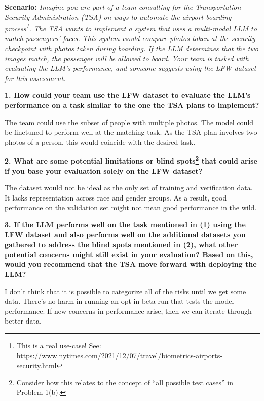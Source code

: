 \documentclass{article}
\begin{document}
\textbf{Scenario:} \textit{Imagine you are part of a team consulting for the Transportation Security Administration (TSA) on ways to automate the airport boarding process\footnote{ This is a real use-case! See:  \url{https://www.nytimes.com/2021/12/07/travel/biometrics-airports-security.html}}. The TSA wants to implement a system that uses a multi-modal LLM to match passengers' faces. This system would compare photos taken at the security checkpoint with photos taken during boarding. If the LLM determines that the two images match, the passenger will be allowed to board. Your team is tasked with evaluating the LLM's performance, and someone suggests using the LFW dataset for this assessment.}

\bigskip

\textbf{1. How could your team use the LFW dataset to evaluate the LLM's performance on a task similar to the one the TSA plans to implement?}

\bigskip
\begin{mdframed}

    The team could use the subset of people with multiple photos. The model could be finetuned to 
    perform well at the matching task. As the TSA plan involves two photos of a person, this would coincide with the desired task.

\end{mdframed}
\bigskip


\textbf{2. What are some potential limitations or blind spots\footnote{Consider how this relates to the concept of ``all possible test cases'' in Problem 1(b).} that could arise if you base your evaluation solely on the LFW dataset?}
\bigskip
\begin{mdframed}

    The dataset would not be ideal as the only set of training and verification data. It lacks representation across race and gender groups. As a result, 
    good performance on the validation set might not mean good performance in the wild.

\end{mdframed}
\bigskip

\textbf{3. If the LLM performs well on the task mentioned in (1) using the LFW dataset and also performs well on the additional datasets you gathered to address the blind spots mentioned in (2), what other potential concerns might still exist in your evaluation? Based on this, would you recommend that the TSA move forward with deploying the LLM?}

\bigskip
\begin{mdframed}
    
    I don't think that it is possible to categorize all of the risks until we get some data. There's no harm in running an opt-in beta run that 
    tests the model performance. If new concerns in performance arise, then we can iterate through better data.

\end{mdframed}
\bigskip
\end{document}
